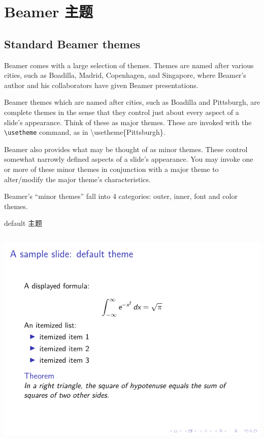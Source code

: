 \begin{column}{0.5\textwidth}
\section{Beamer 主题}

\subsection{Standard Beamer themes}

Beamer comes with a large selection of themes. Themes are named after various cities, such as Boadilla, Madrid, Copenhagen, and Singapore, where Beamer’s author and his collaborators have given Beamer presentations.

Beamer themes which are named after cities, such as Boadilla and Pittsburgh, are complete themes in the sense that they control just about every aspect of a slide’s appearance. Think of these as major themes. These are invoked with the \verb|\usetheme| command, as in {\ttfamily \textbackslash usetheme\{Pittsburgh\}}.

Beamer also provides what may be thought of as minor themes. These control somewhat narrowly defined aspects of a slide’s appearance. You may invoke one or more of these minor themes in conjunction with a major theme to alter/modify the major theme’s characteristics.

Beamer’s “minor themes” fall into 4 categories: outer, inner, font and color themes.

default 主题

\inputminted[linenos=true]{latex}{examples/beamer/theme-default.tex}

\includegraphics{examples/beamer/theme-default.pdf}


\end{column}
